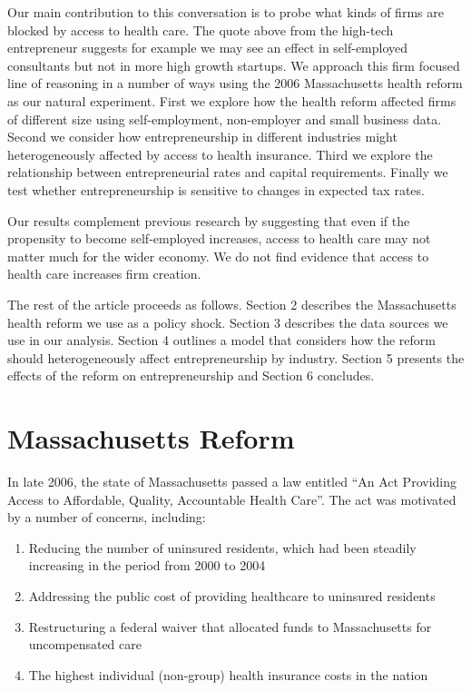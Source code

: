 \documentclass[12pt]{article}
\begin{document}
Our main contribution to this conversation is to probe what kinds of firms are blocked by access to health care. The quote above from the high-tech entrepreneur suggests for example we may see an effect in self-employed consultants but not in more high growth startups. We approach this firm focused line of reasoning in a number of ways using the 2006 Massachusetts health reform as our natural experiment. First we explore how the health reform affected firms of different size using self-employment, non-employer and small business data. Second we consider how entrepreneurship in different industries might heterogeneously affected by access to health insurance. Third we explore the relationship between entrepreneurial rates and capital requirements. Finally we test whether entrepreneurship is sensitive to changes in expected tax rates. 

Our results complement previous research by suggesting that even if the propensity to become self-employed increases, access to health care may not matter much for the wider economy. We do not find evidence that access to health care increases firm creation.  

The rest of the article proceeds as follows. Section 2 describes the Massachusetts health reform we use as a policy shock. Section 3 describes the data sources we use in our analysis. Section 4 outlines a model that considers how the reform should heterogeneously affect entrepreneurship by industry. Section 5 presents the effects of the reform on entrepreneurship and Section 6 concludes. 

\section{Massachusetts Reform}

In late 2006, the state of Massachusetts passed a law entitled ``An Act Providing Access to Affordable, Quality, Accountable Health Care''. The act was motivated by a number of concerns, including:

\begin{enumerate}
\item Reducing the number of uninsured residents, which had been steadily increasing in the period from 2000 to 2004 \cite{bisweek}
\item Addressing the public cost of providing healthcare to uninsured residents \cite{npr}
\item Restructuring a federal waiver that allocated funds to Massachusetts for uncompensated care \cite{heritage}
\item The highest individual (non-group) health insurance costs in the nation \cite{gruber}
\end{enumerate}
\end{document}
